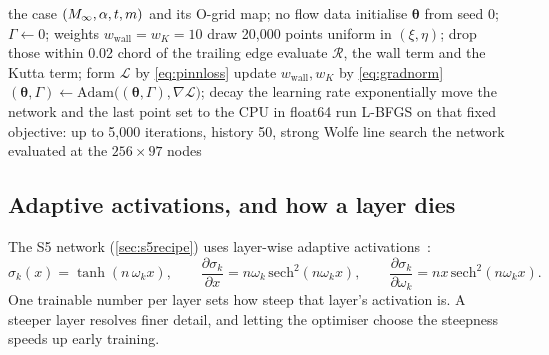 \begin{algorithm}[t]
\caption{PINN training for one case (\texttt{apno.models.train\_pinn.train})}
\label{alg:pinn}
\small
\begin{algorithmic}[1]
\Require the case $(M_\infty,\alpha,t,m)$ and its O-grid map; no flow data
\State initialise $\bm\theta$ from seed 0; $\Gamma\gets0$; weights $w_{\mathrm{wall}} = w_K = 10$
 
    \State draw 20,000 points uniform in $(\xi,\eta)$; drop those within 0.02 chord of the trailing edge
  \EndIf
  \State evaluate $\mathcal R$, the wall term and the Kutta term; form $\mathcal L$ by \cref{eq:pinnloss}
   \State update $w_{\mathrm{wall}}, w_K$ by \cref{eq:gradnorm}
  \EndIf
  \State $(\bm\theta,\Gamma)\gets\mathrm{Adam}\bigl((\bm\theta,\Gamma),\nabla\mathcal L\bigr)$; decay the learning rate exponentially
\EndFor
\State move the network and the last point set to the CPU in float64
\State run L-BFGS on that fixed objective: up to 5,000 iterations, history 50, strong Wolfe line search
\State \Return the network evaluated at the $256\times97$ nodes
\end{algorithmic}
\end{algorithm}

\subsection{Adaptive activations, and how a layer dies}
\label{app:deadlayer}

The S5 network (\cref{sec:s5recipe}) uses layer-wise adaptive activations~\cite{jagtap2020}:
\begin{equation}
  \sigma_k(x) = \tanh(n\,\omega_k x),\qquad
  \frac{\partial\sigma_k}{\partial x} = n\omega_k\,\mathrm{sech}^2(n\omega_k x),\qquad
  \frac{\partial\sigma_k}{\partial \omega_k} = n x\,\mathrm{sech}^2(n\omega_k x).
  \label{eq:adaptivetanh}
\end{equation}
One trainable number per layer sets how steep that layer's activation is. A steeper layer resolves
finer detail, and letting the optimiser choose the steepness speeds up early training.

